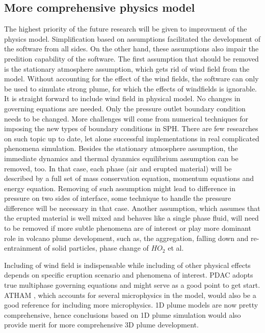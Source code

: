 \subsection{More comprehensive physics model}
The highest priority of the future research will be given to improvment of the physics model. Simplification based on assumptions facilitated the development of the software from all sides. On the other hand, these assumptions also impair the predition capability of the software. The first assumption that should be removed is the stationary atmosphere assumption, which gets rid of wind field from the model. Without accounting for the effect of the wind fields, the software can only be used to simulate strong plume, for which the effects of windfields is ignorable. It is straight forward to include wind field in physical model. No changes in governing equations are needed. Only the pressure outlet boundary condition needs to be changed. More challenges will come from numerical techniques for imposing the new types of boundary conditions in SPH. There are few researches on such topic up to date, let alone successful implementations in real complicated phenomena simulation. Besides the stationary atmosphere assumption, the immediate dynamics and thermal dyanmics equilibrium assumption can be removed, too. In that case, each phase (air and erupted material) will be described by a full set of mass conservation equation, momentum equations and energy equation. Removing of such assumption might lead to difference in pressure on two sides of interface, some technique to handle the pressure difference will be necessary in that case. Another assumption, which assumes that the erupted material is well mixed and behaves like a single phase fluid, will need to be removed if more subtle phenomena are of interest or play more dominant role in volcano plume development, such as, the aggregation, falling down and re-entrainment of solid particles, phase change of $HO_2$ et al. 

Including of wind field is indispensable while including of other physical effects depends on specific eruption scenario and phenomena of interest. PDAC\citep{neri2003multiparticle} adopts true multiphase governing equations and might serve as a good point to get start. ATHAM  \citep{oberhuber1998volcanic}, which accounts for several microphysics in the model, would also be a good reference for including more microphysics. 1D plume models \citep{bursik2001effect, pouget2016sensitivity, folch2016fplume} are now pretty comprehensive, hence conclusions based on 1D plume simulation would also provide merit for more comprehensive 3D plume development.

